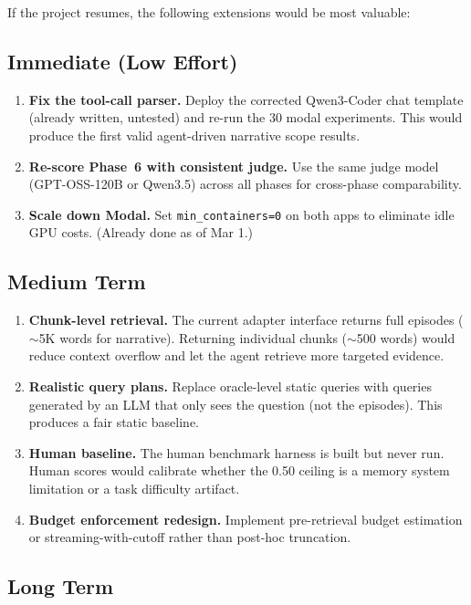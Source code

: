 \documentclass[11pt,letterpaper]{article}
\begin{document}
If the project resumes, the following extensions would be most valuable:

\subsection{Immediate (Low Effort)}

\begin{enumerate}[nosep]
  \item \textbf{Fix the tool-call parser.} Deploy the corrected Qwen3-Coder chat template (already written, untested) and re-run the 30 modal experiments. This would produce the first valid agent-driven narrative scope results.
  \item \textbf{Re-score Phase~6 with consistent judge.} Use the same judge model (GPT-OSS-120B or Qwen3.5) across all phases for cross-phase comparability.
  \item \textbf{Scale down Modal.} Set \texttt{min\_containers=0} on both apps to eliminate idle GPU costs. (Already done as of Mar 1.)
\end{enumerate}

\subsection{Medium Term}

\begin{enumerate}[nosep]
  \item \textbf{Chunk-level retrieval.} The current adapter interface returns full episodes ($\sim$5K words for narrative). Returning individual chunks ($\sim$500 words) would reduce context overflow and let the agent retrieve more targeted evidence.
  \item \textbf{Realistic query plans.} Replace oracle-level static queries with queries generated by an LLM that only sees the question (not the episodes). This produces a fair static baseline.
  \item \textbf{Human baseline.} The human benchmark harness is built but never run. Human scores would calibrate whether the 0.50 ceiling is a memory system limitation or a task difficulty artifact.
  \item \textbf{Budget enforcement redesign.} Implement pre-retrieval budget estimation or streaming-with-cutoff rather than post-hoc truncation.
\end{enumerate}

\subsection{Long Term}
\end{document}
